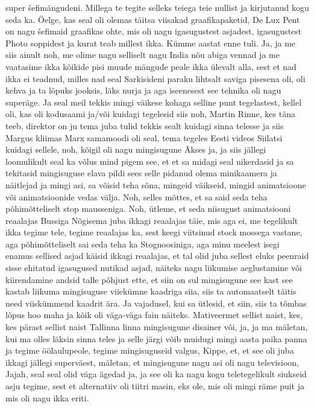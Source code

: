 super šefimängudeni. Millega te tegite selleks teiega teie nullist ja kirjutanud kogu seda ka. Öelge, kas seal oli olemas täitsa viisakad graafikapaketid, De Lux Pent on nagu šefimaid graafikas ohte, mis oli nagu igasugustest asjadest, igasugustest Photo soppidest ja kurat teab millest ikka. Kümme aastat enne tuli. Ja, ja me siis ainult noh, me olime nagu selliselt nagu India nõu abiga vennad ja me vaatasime ikka kõikide pisi muude mängude peale ikka ülevalt alla, sest et nad ikka ei teadnud, milles nad seal Sarkisideni paraku lihtsalt saviga pisesena oli, oli kehva ja ta lõpuks jooksis, läks nurja ja aga iseenesest see tehnika oli nagu superäge. Ja seal meil tekkis mingi väikese kohaga selline punt tegelastest, kellel oli, kas oli kodusaami ja/või kuidagi tegelesid siis noh, Martin Rinne, kes täna teeb, direktor on ju tema juba tulid tekkis sealt kuidagi sinna telesse ja siis Margus kliimas Marx samamoodi oli seal, tema tegeles Eesti videos Siilatsi kuidagi sellele, noh, kõigil oli nagu mingisugune Äkses ja, ja siis jällegi loomulikult seal ka võlus mind pigem see, et et sa midagi seal nikerdasid ja sa tekitasid mingisuguse elava pildi sees selle pidanud olema minikaamera ja näitlejad ja mingi asi, sa võisid teha sõna, mingeid väikseid, mingid animatsioone või animatsioonide vedas välja. Noh, selles mõttes, et sa said seda teha põhimõtteliselt stop mausseniga. Noh, ütleme, et seda niisugust animatsiooni reaalajas
Bussiga Nõgisema juba ikkagi reaalajas täie, mis aga ei, me tegelikult ikka tegime tele, tegime reaalajas ka, sest keegi viitsinud stock mossega vastane, aga põhimõtteliselt sai seda teha ka Stognoosiniga, aga minu meelest isegi enamus sellised asjad käisid ikkagi reaalajas, et tal olid juba sellest eluks peenraid sisse ehitatud igasugused nutikad asjad, näiteks nagu liikumise aeglustamine või kiirendamine andsid talle põhjust ette, et siin on sul mingisugune see kast see kastab liikuma mingisuguse viiekümne kaadriga siia, siis ta automaatselt täitis need viiskümmend kaadrit ära. Ja vajadusel, kui sa ütlesid, et siin, siis ta tõmbas lõpus hoo maha ja kõik oli väga-väga fain näiteks. Mativeermet sellist naist, kes, kes pärast sellist naist Tallinna linna mingisugune disainer või, ja, ja ma mäletan, kui ma olles läksin sinna teles ja selle järgi võib muidugi mingi aasta paika panna ja tegime öölaulupeole, tegime mingisuguseid valgus, Kippe, et, et see oli juba ikkagi jällegi superväest, mäletan, et mingisugune nagu asi oli nagu televisioon, Jajah, seal seal olid väga ägedad ja, ja see oli ka nagu kogu teletegelikult siukseid asju tegime, sest et alternatiiv oli tiitri masin, eks ole, mis oli mingi räme puit ja mis oli nagu ikka eriti.
